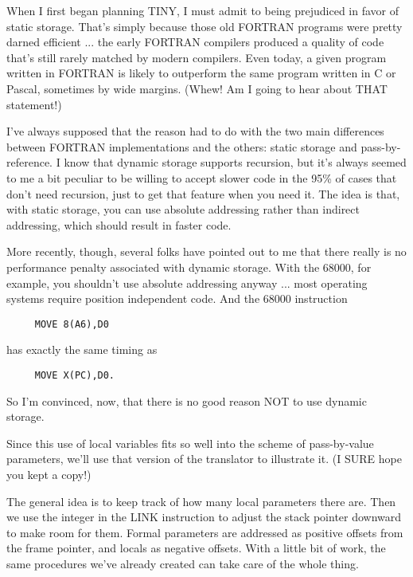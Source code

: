 When  I  first  began  planning  TINY, I  must  admit  to  being prejudiced in favor of static  storage. That's  simply because those old FORTRAN  programs  were pretty darned efficient ... the early FORTRAN compilers  produced  a quality of code that's still rarely matched by modern compilers. Even today, a given program written  in  FORTRAN  is likely to outperform  the  same  program written in C or Pascal, sometimes  by  wide margins. (Whew!  Am I going to hear about THAT statement!)

I've always supposed that the reason had to do with the  two main differences  between  FORTRAN  implementations  and  the  others: static  storage  and  pass-by-reference. I  know  that dynamic storage  supports  recursion, but it's always seemed to me a bit peculiar to be willing to accept slower code in the 95\%  of cases that don't need recursion, just to get that feature when you need it. The idea is that, with static storage, you can  use absolute addressing  rather than indirect addressing, which should  result in faster code.

More recently, though, several folks  have pointed out to me that there really is no performance  penalty  associated  with dynamic storage. With the 68000, for example, you shouldn't use absolute addressing  anyway  ... most  operating systems require position independent code. And the 68000 instruction

\begin{verbatim}
     MOVE 8(A6),D0
\end{verbatim}

has exactly the same timing as

\begin{verbatim}
     MOVE X(PC),D0.
\end{verbatim}

So  I'm  convinced, now, that there is no good reason NOT to use dynamic storage.

Since this use of local variables fits so well into the scheme of pass-by-value  parameters, we'll  use   that   version   of  the translator to illustrate it. (I  SURE  hope you kept a copy!)

The general idea is to keep track of how  many  local  parameters there  are. Then we use the integer in the LINK instruction to adjust the stack pointer downward to make room for them. Formal parameters are  addressed  as  positive  offsets  from  the frame pointer, and locals as negative offsets. With a  little  bit  of work, the same procedures we've  already created can take care of the whole thing.

